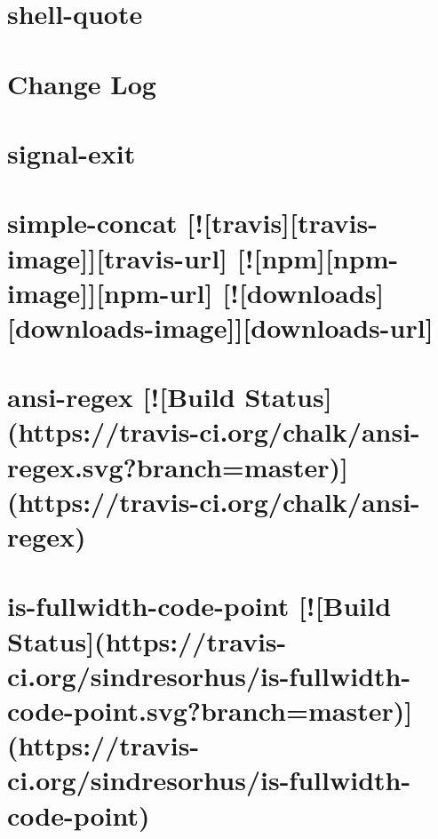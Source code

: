 \documentclass[twoside]{book}
\newcommand{\+}{\discretionary{\mbox{\scriptsize$\hookleftarrow$}}{}{}}
\begin{document}
\chapter{shell-\/quote}
\label{md_dsmacc_examples_DRmerge_node_modules_shell-quote_readme}

\chapter{Change Log}
\label{md_dsmacc_examples_DRmerge_node_modules_signal-exit_CHANGELOG}

\chapter{signal-\/exit}
\label{md_dsmacc_examples_DRmerge_node_modules_signal-exit_README}

\chapter{simple-\/concat \mbox{[}!\mbox{[}travis\mbox{]}\mbox{[}travis-\/image\mbox{]}\mbox{]}\mbox{[}travis-\/url\mbox{]} \mbox{[}!\mbox{[}npm\mbox{]}\mbox{[}npm-\/image\mbox{]}\mbox{]}\mbox{[}npm-\/url\mbox{]} \mbox{[}!\mbox{[}downloads\mbox{]}\mbox{[}downloads-\/image\mbox{]}\mbox{]}\mbox{[}downloads-\/url\mbox{]}}
\label{md_dsmacc_examples_DRmerge_node_modules_simple-concat_README}

\chapter{ansi-\/regex \mbox{[}!\mbox{[}Build Status\mbox{]}(https\+://travis-\/ci.org/chalk/ansi-\/regex.svg?branch=master)\mbox{]}(https\+://travis-\/ci.org/chalk/ansi-\/regex)}
\label{md_dsmacc_examples_DRmerge_node_modules_single-line-log_node_modules_ansi-regex_readme}

\chapter{is-\/fullwidth-\/code-\/point \mbox{[}!\mbox{[}Build Status\mbox{]}(https\+://travis-\/ci.org/sindresorhus/is-\/fullwidth-\/code-\/point.svg?branch=master)\mbox{]}(https\+://travis-\/ci.org/sindresorhus/is-\/fullwidth-\/code-\/point)}
\label{md_dsmacc_examples_DRmerge_node_modules_single-line-log_node_modules_is-fullwidth-code-point_readme}

\end{document}
